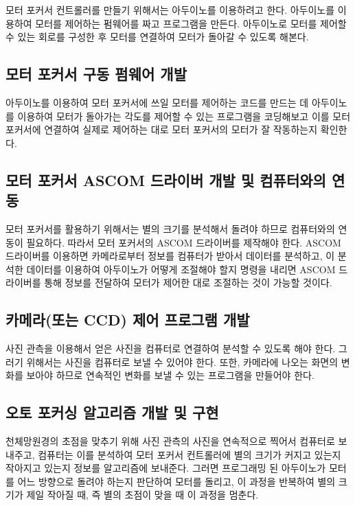 \documentclass{abstract_hutech}
\begin{document}
모터 포커서 컨트롤러를 만들기 위해서는 아두이노를 이용하려고 한다. 아두이노를 이용하여 모터를 제어하는 펌웨어를 짜고 프로그램을 만든다. 아두이노로 모터를 제어할 수 있는 회로를 구성한 후 모터를 연결하여 모터가 돌아갈 수 있도록 해본다.

\subsection{모터 포커서 구동 펌웨어 개발}

아두이노를 이용하여 모터 포커서에 쓰일 모터를 제어하는 코드를 만드는 데 아두이노를 이용하여 모터가 돌아가는 각도를 제어할 수 있는 프로그램을 코딩해보고 이를 모터 포커서에 연결하여 실제로 제어하는 대로 모터 포커서의 모터가 잘 작동하는지 확인한다.

\subsection{모터 포커서 ASCOM 드라이버 개발 및 컴퓨터와의 연동}

모터 포커서를 활용하기 위해서는 별의 크기를 분석해서 돌려야 하므로 컴퓨터와의 연동이 필요하다. 따라서 모터 포커서의 ASCOM 드라이버를 제작해야 한다. ASCOM 드라이버를 이용하면 카메라로부터 정보를 컴퓨터가 받아서 데이터를 분석하고, 이 분석한 데이터를 이용하여 아두이노가 어떻게 조절해야 할지 명령을 내리면 ASCOM 드라이버를 통해 정보를 전달하여 모터가 제어한 대로 조절하는 것이 가능할 것이다.

\subsection{카메라(또는 CCD) 제어 프로그램 개발}

사진 관측을 이용해서 얻은 사진을 컴퓨터로 연결하여 분석할 수 있도록 해야 한다. 그러기 위해서는 사진을 컴퓨터로 보낼 수 있어야 한다. 또한, 카메라에 나오는 화면의 변화를 보아야 하므로 연속적인 변화를 보낼 수 있는 프로그램을 만들어야 한다.

\subsection{오토 포커싱 알고리즘 개발 및 구현}

천체망원경의 초점을 맞추기 위해 사진 관측의 사진을 연속적으로 찍어서 컴퓨터로 보내주고, 컴퓨터는 이를 분석하여 모터 포커서 컨트롤러에 별의 크기가 커지고 있는지 작아지고 있는지 정보를 알고리즘에 보내준다. 그러면 프로그래밍 된 아두이노가 모터를 어느 방향으로 돌려야 하는지 판단하여 모터를 돌리고, 이 과정을 반복하여 별의 크기가 제일 작아질 때, 즉 별의 초점이 맞을 때 이 과정을 멈춘다.
\end{document}
